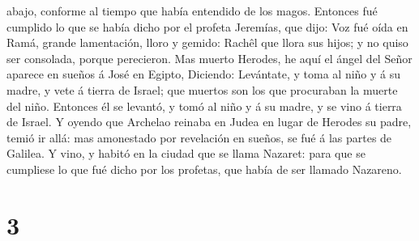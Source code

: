 abajo, conforme al tiempo que había entendido de los magos.
 Entonces fué cumplido lo que se había dicho por el
profeta Jeremías, que dijo:  Voz fué oída en Ramá, grande
lamentación, lloro y gemido: Rachêl que llora sus hijos; y no quiso ser
consolada, porque perecieron.  Mas muerto Herodes, he
aquí el ángel del Señor aparece en sueños á José en Egipto,
 Diciendo: Levántate, y toma al niño y á su madre, y vete
á tierra de Israel; que muertos son los que procuraban la muerte del
niño.  Entonces él se levantó, y tomó al niño y á su
madre, y se vino á tierra de Israel.  Y oyendo que
Archelao reinaba en Judea en lugar de Herodes su padre, temió ir allá:
mas amonestado por revelación en sueños, se fué á las partes de Galilea.
 Y vino, y habitó en la ciudad que se llama Nazaret: para
que se cumpliese lo que fué dicho por los profetas, que había de ser
llamado Nazareno.

\hypertarget{section-2}{%
\section{3}\label{section-2}}

